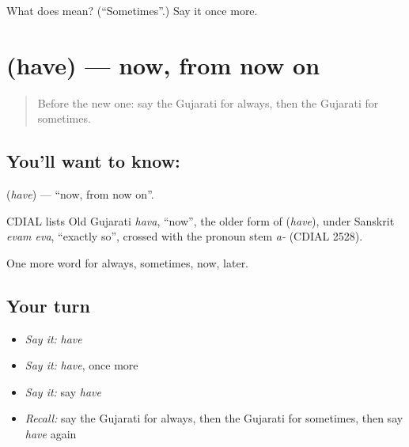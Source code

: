 \begin{tcolorbox}[breakable,colback=teal!4,colframe=teal!35!black,title={Before you move on}]
What does  mean? (\textquotedblleft{}Sometimes\textquotedblright{}.) Say it once more.
\end{tcolorbox}
\section[\texorpdfstring{\gu{હવે} (have)}{હવે (have)}]{ (have) — now, from now on}

\label{lesson:GU-C77-now}



\begin{quote}
Before the new one: say the Gujarati for always, then the Gujarati for sometimes.
\end{quote}

\subsection*{You'll want to know: }
\textbf{} (\emph{have}) — \textquotedblleft{}now, from now on\textquotedblright{}.

\begin{cousinweb}
CDIAL lists Old Gujarati \emph{hava}, \textquotedblleft{}now\textquotedblright{}, the older form of \textbf{} (\emph{have}), under Sanskrit \emph{evam eva}, \textquotedblleft{}exactly so\textquotedblright{}, crossed with the pronoun stem \emph{a-} (CDIAL 2528).
\end{cousinweb}

\begin{grammarlens}[title={What you've built}]
One more word for always, sometimes, now, later.
\end{grammarlens}

\subsection*{Your turn}
\begin{itemize}
\raggedright
  \item \emph{Say it:} \emph{have}
  \item \emph{Say it:} \emph{have}, once more
  \item \emph{Say it:} say \emph{have}
  \item \emph{Recall:} say the Gujarati for always, then the Gujarati for sometimes, then say \emph{have} again
\end{itemize}

